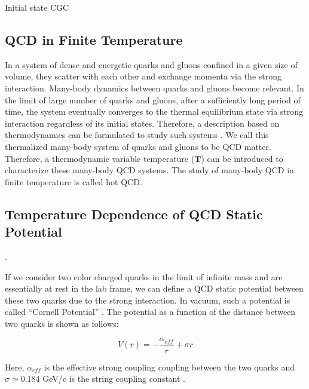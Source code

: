 Initial state CGC 

\fi

\subsection{QCD in Finite Temperature} 


In a system of dense and energetic quarks and gluons confined in a given size of volume, they scatter with each other and exchange momenta via the strong interaction. Many-body dynamics between quarks and gluons become relevant. In the limit of large number of quarks and gluons, after a sufficiently long period of time, the system eventually converges to the thermal equilibrium state via strong interaction \cite{MLBThermal,ADSCFTThermal,QCDThermal} regardless of its initial states. Therefore, a description based on thermodynamics can be formulated to study such systems \cite{QCDThemDyn}. We call this thermalized many-body system of quarks and gluons to be QCD matter. Therefore, a thermodynamic variable temperature ($\mathbf{T}$) can be introduced to characterize these many-body QCD systems. The study of many-body QCD in finite temperature is called hot QCD. 



\subsection{Temperature Dependence of QCD Static Potential}. 

If we consider two color charged quarks in the limit of infinite mass and are essentially at rest in the lab frame, we can define a QCD static potential between these two quarks due to the strong interaction. In vacuum, such a potential is called ``Cornell Potential'' \cite{Cornell}. The potential as a function of the distance between two quarks is shown as follows:

\begin{equation}
V(r) = -\frac{\alpha_{eff}}{r} + \sigma r
\end{equation}

Here, $\alpha_{eff}$ is the effective strong coupling coupling between the two quarks and $\sigma \simeq 0.184$ GeV/c is the string coupling constant \cite{CornellEquation}. 

